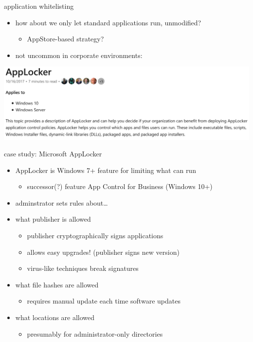 \begin{frame}{application whitelisting}
\begin{itemize}
\item how about we only let standard applications run, unmodified?
    \begin{itemize}
    \item AppStore-based strategy?
    \end{itemize}
\item not uncommon in corporate environments:
\end{itemize}
\vspace{.5cm}
\includegraphics[width=\textwidth]{../heur-detect/applocker-manual}
\end{frame}

\begin{frame}{case study: Microsoft AppLocker}
    \begin{itemize}
    \item AppLocker is Windows 7+ feature for limiting what can run
        \begin{itemize}
        \item successor(?) feature App Control for Business (Windows 10+)
        \end{itemize}
    \item adminstrator sets rules about\ldots
    \item what publisher is allowed
        \begin{itemize}
        \item publisher cryptographically signs applications
        \item allows easy upgrades! (publisher signs new version)
        \item virus-like techniques break signatures
        \end{itemize}
    \item what file hashes are allowed
        \begin{itemize}
        \item requires manual update each time software updates
        \end{itemize}
    \item what locations are allowed
        \begin{itemize}
        \item presumably for administrator-only directories
        \end{itemize}
    \end{itemize}
\end{frame}

